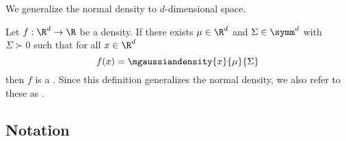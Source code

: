 

We generalize the normal density
to $d$-dimensional space.


Let $f: \R^d \to \R$ be a density.
If there exists $\mu \in \R^d$ and
$\Sigma \in \symm^d$
with $\Sigma \succ 0$ such that for all $x \in \R^d$
\[
  f(x) = \mgaussiandensity{x}{\mu}{\Sigma}
\]
then $f$ is a .
Since this definition generalizes the normal density,
we also refer to these as .

\subsection{Notation}
